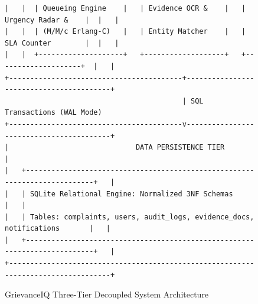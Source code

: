 \begin{figure}[h]
\begin{verbatim}
|   |  | Queueing Engine    |   | Evidence OCR &    |   | Urgency Radar &    |  |   |
|   |  | (M/M/c Erlang-C)   |   | Entity Matcher    |   | SLA Counter        |  |   |
|   |  +--------------------+   +-------------------+   +--------------------+  |   |
+-----------------------------------------+-----------------------------------------+
                                          | SQL Transactions (WAL Mode)
+-----------------------------------------v-----------------------------------------+
|                              DATA PERSISTENCE TIER                                |
|   +---------------------------------------------------------------------------+   |
|   | SQLite Relational Engine: Normalized 3NF Schemas                          |   |
|   | Tables: complaints, users, audit_logs, evidence_docs, notifications       |   |
|   +---------------------------------------------------------------------------+   |
+-----------------------------------------------------------------------------------+
\end{verbatim}
\caption{GrievanceIQ Three-Tier Decoupled System Architecture}
\label{fig:arch_diagram}
\end{figure}

